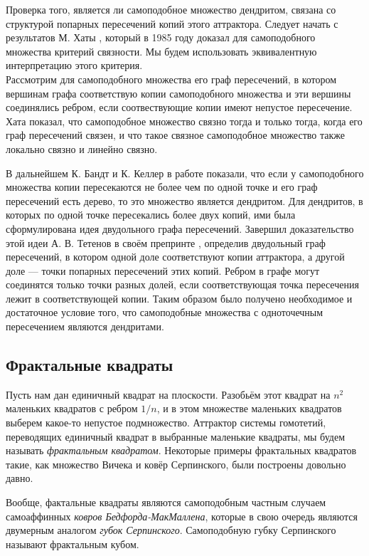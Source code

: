 Проверка того, является ли самоподобное множество дендритом, связана со структурой попарных пересечений копий этого аттрактора.
Следует начать с результатов М. Хаты \cite{Hata1985}, который в 1985 году доказал для самоподобного множества критерий связности.
Мы будем использовать эквивалентную интерпретацию этого критерия.\\
Рассмотрим для самоподобного множества его граф пересечений, в котором вершинам графа соответствую копии самоподобного множества и эти вершины соединялись ребром, если соотвествующие копии имеют непустое пересечение.
Хата показал, что самоподобное множество связно тогда и только тогда, когда его граф пересечений связен, и что такое связное самоподобное множество также локально связно и линейно связно.

В дальнейшем К. Бандт и К. Келлер в работе \cite{SSS2} показали, что если у самоподобного множества копии пересекаются не более чем по одной точке и его граф пересечений есть дерево, то это множество является дендритом. Для дендритов, в которых по одной точке пересекались более двух копий, ими была сформулирована идея двудольного графа пересечений. 
Завершил доказательство этой идеи А. В. Тетенов в своём препринте \cite{FIP}, определив двудольный граф пересечений, в котором одной доле соответствуют копии аттрактора, а другой доле --- точки попарных пересечений этих копий. Ребром в графе могут соединятся только точки разных долей, если соответствующая точка пересечения лежит в соответствующей копии.
Таким образом было получено необходимое и достаточное условие того, что самоподобные множества с одноточечным пересечением являются дендритами.\\


\subsection{Фрактальные квадраты}
\label{ssec:HFS}

Пусть нам дан единичный квадрат на плоскости.
Разобьём этот квадрат на $n^2$ маленьких квадратов с ребром $1/n$, и в этом множестве маленьких квадратов выберем какое-то непустое подмножество.
Аттрактор системы гомотетий, переводящих единичный квадрат в выбранные маленькие квадраты, мы будем называть {\em фрактальным квадратом}.
Некоторые примеры фрактальных квадратов такие, как множество Вичека и ковёр Серпинского, были построены довольно давно.

Вообще, фактальные квадраты являются самоподобным частным случаем самоаффинных {\em ковров Бедфорда-МакМаллена}, которые в свою очередь являются двумерным аналогом {\em губок Серпинского}.
Самоподобную губку Серпинского называют фрактальным кубом.

